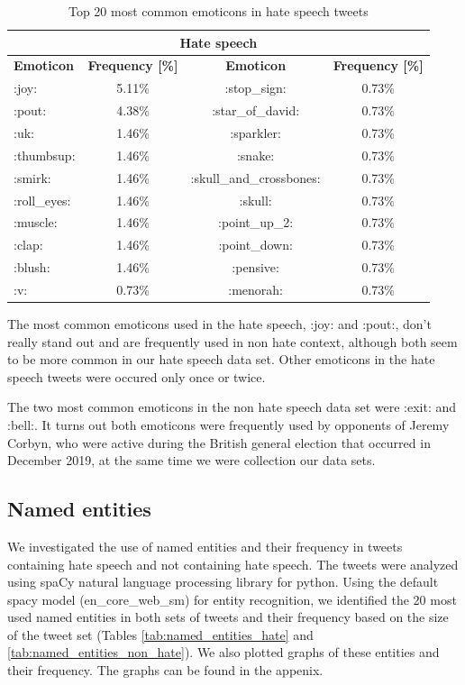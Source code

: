 \documentclass[conference]{IEEEtran}
\begin{document}
\begin{table}[!ht]
    \def\arraystretch{1.2}%
    \begin{center}
      \caption{Top 20 most common emoticons in hate speech tweets}
      \label{tab:emoticons_hate}
      \begin{tabular}{l c | c c}
        \hline\hline
        \multicolumn{4}{c}{\textbf{Hate speech}}\\
        \hline
        \textbf{Emoticon}&\textbf{Frequency [\%]}&\textbf{Emoticon}&\textbf{Frequency [\%]}\\
        \hline
        :joy: & 5.11\% & :stop\_sign: & 0.73\%\\
        :pout: & 4.38\% & :star\_of\_david: & 0.73\%\\
        :uk: & 1.46\% & :sparkler: & 0.73\%\\
        :thumbsup: & 1.46\% & :snake: & 0.73\%\\
        :smirk: & 1.46\% & :skull\_and\_crossbones: & 0.73\%\\
        :roll\_eyes: & 1.46\% & :skull: & 0.73\%\\
        :muscle: & 1.46\% & :point\_up\_2: & 0.73\%\\
        :clap: & 1.46\% & :point\_down: & 0.73\%\\
        :blush: & 1.46\% & :pensive: & 0.73\%\\
        :v: & 0.73\% & :menorah: & 0.73\%\\                        
        \hline\hline
      \end{tabular}  
    \end{center}
\end{table}

The most common emoticons used in the hate speech, :joy: and :pout:, don't really stand out 
and are frequently used in non hate context, although both seem to be more common in our 
hate speech data set. Other emoticons in the hate speech tweets were occured only once or twice.

The two most common emoticons in the non hate speech data set were :exit: and :bell:. 
It turns out both emoticons were frequently used by opponents of Jeremy Corbyn, who 
were active during the British general election that occurred in December 2019, at 
the same time we were collection our data sets.

\subsection{Named entities}
We investigated the use of named entities and their frequency in tweets containing hate 
speech and not containing hate speech. The tweets were analyzed using spaCy natural 
language processing library for python. Using the default spacy model (en\_core\_web\_sm) 
for entity recognition, we identified the 20 most used named entities in both sets of 
tweets and their frequency based on the size of the tweet set 
(Tables \ref{tab:named_entities_hate} and \ref{tab:named_entities_non_hate}).
We also plotted graphs of these entities and their frequency. The graphs can be found in 
the appenix. 
\end{document}
